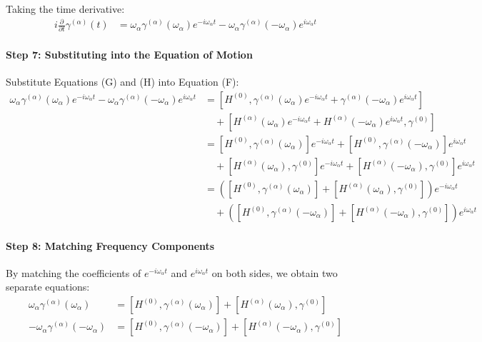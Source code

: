 Taking the time derivative:
\begin{align}
i \frac{\partial}{\partial t} \gamma^{(\alpha)}(t) &= \omega_{\alpha} \gamma^{(\alpha)}(\omega_{\alpha}) e^{-i \omega_{\alpha} t} - \omega_{\alpha} \gamma^{(\alpha)}(-\omega_{\alpha}) e^{i \omega_{\alpha} t} \end{align}

\paragraph{Step 7: Substituting into the Equation of Motion}

Substitute Equations (G) and (H) into Equation (F):
\begin{align}
\omega_{\alpha} \gamma^{(\alpha)}(\omega_{\alpha}) e^{-i \omega_{\alpha} t} - \omega_{\alpha} \gamma^{(\alpha)}(-\omega_{\alpha}) e^{i \omega_{\alpha} t} &= [H^{(0)}, \gamma^{(\alpha)}(\omega_{\alpha}) e^{-i \omega_{\alpha} t} + \gamma^{(\alpha)}(-\omega_{\alpha}) e^{i \omega_{\alpha} t}] \nonumber \\
&\quad + [H^{(\alpha)}(\omega_{\alpha}) e^{-i \omega_{\alpha} t} + H^{(\alpha)}(-\omega_{\alpha}) e^{i \omega_{\alpha} t}, \gamma^{(0)}] \nonumber \\
&= [H^{(0)}, \gamma^{(\alpha)}(\omega_{\alpha})] e^{-i \omega_{\alpha} t} + [H^{(0)}, \gamma^{(\alpha)}(-\omega_{\alpha})] e^{i \omega_{\alpha} t} \nonumber \\
&\quad + [H^{(\alpha)}(\omega_{\alpha}), \gamma^{(0)}] e^{-i \omega_{\alpha} t} + [H^{(\alpha)}(-\omega_{\alpha}), \gamma^{(0)}] e^{i \omega_{\alpha} t} \nonumber \\
&= \left( [H^{(0)}, \gamma^{(\alpha)}(\omega_{\alpha})] + [H^{(\alpha)}(\omega_{\alpha}), \gamma^{(0)}] \right) e^{-i \omega_{\alpha} t} \nonumber \\
&\quad + \left( [H^{(0)}, \gamma^{(\alpha)}(-\omega_{\alpha})] + [H^{(\alpha)}(-\omega_{\alpha}), \gamma^{(0)}] \right) e^{i \omega_{\alpha} t} \nonumber
\end{align}

\paragraph{Step 8: Matching Frequency Components}

By matching the coefficients of \( e^{-i \omega_{\alpha} t} \) and \( e^{i \omega_{\alpha} t} \) on both sides, we obtain two separate equations:
\begin{align}
\omega_{\alpha} \gamma^{(\alpha)}(\omega_{\alpha}) &= [H^{(0)}, \gamma^{(\alpha)}(\omega_{\alpha})] + [H^{(\alpha)}(\omega_{\alpha}), \gamma^{(0)}]  \\
-\omega_{\alpha} \gamma^{(\alpha)}(-\omega_{\alpha}) &= [H^{(0)}, \gamma^{(\alpha)}(-\omega_{\alpha})] + [H^{(\alpha)}(-\omega_{\alpha}), \gamma^{(0)}] 
\end{align}

